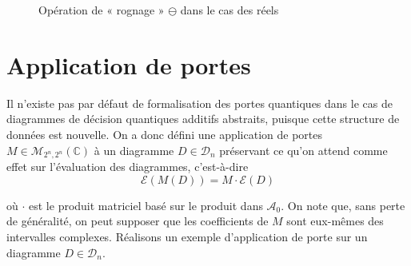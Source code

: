 \begin{figure}[ht]
  \centering
  \caption{Opération de « rognage » $\ominus$ dans le cas des réels}
  \label{fig:rognage}
\end{figure}

\section{Application de portes}
\label{sec:Portes}

Il n'existe pas par défaut de formalisation des portes quantiques dans le cas de diagrammes de décision quantiques additifs abstraits, puisque cette structure de données est nouvelle. On a donc défini une application de portes $M \in \mathcal M_{2^n, 2^n}(\mathbb C)$ à un diagramme $D \in \mathcal D_n$ préservant ce qu'on attend comme effet sur l'évaluation des diagrammes, c'est-à-dire
$$\mathcal E(M(D)) = M \cdot \mathcal E(D)$$

\noindent où $\cdot$ est le produit matriciel basé sur le produit dans $\mathcal A_0$.
On note que, sans perte de généralité, on peut supposer que les coefficients de $M$ sont eux-mêmes des intervalles complexes. Réalisons un exemple d'application de porte sur un diagramme $D \in \mathcal D_n$.

